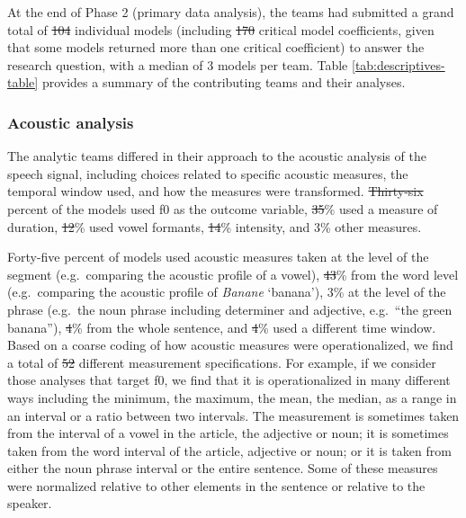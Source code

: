 \documentclass[Review,times,sageh]{sagej}
\providecommand{\DIFaddtex}[1]{{\protect\color{blue}\uwave{#1}}} %
\providecommand{\DIFdeltex}[1]{{\protect\color{red}\sout{#1}}}                      %
\providecommand{\DIFaddbegin}{} %
\providecommand{\DIFaddend}{} %
\providecommand{\DIFdelbegin}{} %
\providecommand{\DIFdelend}{} %
\providecommand{\DIFadd}[1]{\texorpdfstring{\DIFaddtex{#1}}{#1}} %
\providecommand{\DIFdel}[1]{\texorpdfstring{\DIFdeltex{#1}}{}} %
\begin{document}
At the end of Phase 2 (primary data analysis), the teams had submitted a grand total of \DIFdelbegin \DIFdel{104 }\DIFdelend \DIFaddbegin \DIFadd{115 }\DIFaddend individual models (including \DIFdelbegin \DIFdel{170 }\DIFdelend \DIFaddbegin \DIFadd{192 }\DIFaddend critical model coefficients, given that some models returned more than one critical coefficient) to answer the research question, with a median of 3 models per team.
Table \ref{tab:descriptives-table} provides a summary of the contributing teams and their analyses.

\hypertarget{acoustic-analysis}{%
\subsubsection{Acoustic analysis}\label{acoustic-analysis}}

The analytic teams differed in their approach to the acoustic analysis of the speech signal, including choices related to specific acoustic measures, the temporal window used, and how the measures were transformed.
\DIFdelbegin \DIFdel{Thirty-six }\DIFdelend \DIFaddbegin \DIFadd{Thirty-seven }\DIFaddend percent of the models used f0 as the outcome variable, \DIFdelbegin \DIFdel{35}\DIFdelend \DIFaddbegin \DIFadd{33}\DIFaddend \% used a measure of duration, \DIFdelbegin \DIFdel{12}\DIFdelend \DIFaddbegin \DIFadd{13}\DIFaddend \% used vowel formants, \DIFdelbegin \DIFdel{14}\DIFdelend \DIFaddbegin \DIFadd{15}\DIFaddend \% intensity, and 3\% other measures.

Forty-five percent of models used acoustic measures taken at the level of the segment (e.g.~comparing the acoustic profile of a vowel), \DIFdelbegin \DIFdel{43}\DIFdelend \DIFaddbegin \DIFadd{45}\DIFaddend \% from the word level (e.g.~comparing the acoustic profile of \emph{Banane} `banana'), 3\% at the level of the phrase (e.g.~the noun phrase including determiner and adjective, e.g.~``the green banana''), \DIFdelbegin \DIFdel{4}\DIFdelend \DIFaddbegin \DIFadd{3}\DIFaddend \% from the whole sentence, and \DIFdelbegin \DIFdel{4}\DIFdelend \DIFaddbegin \DIFadd{3}\DIFaddend \% used a different time window.
Based on a coarse coding of how acoustic measures were operationalized, we find a total of \DIFdelbegin \DIFdel{52 }\DIFdelend \DIFaddbegin \DIFadd{55 }\DIFaddend different measurement specifications.
For example, if we consider those analyses that target f0, we find that it is operationalized in many different ways including the minimum, the maximum, the mean, the median, as a range in an interval or a ratio between two intervals.
The measurement is sometimes taken from the interval of a vowel in the article, the adjective or noun; it is sometimes taken from the word interval of the article, adjective or noun; or it is taken from either the noun phrase interval or the entire sentence.
Some of these measures were normalized relative to other elements in the sentence or relative to the speaker.
\end{document}

